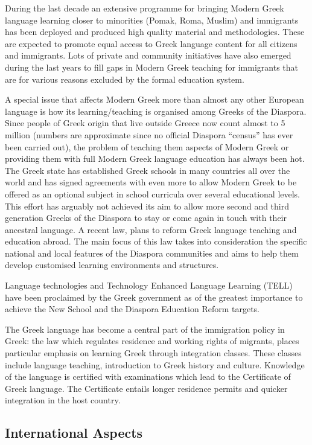 \begin{multicols}{2}
During the last decade an extensive programme for bringing Modern Greek language learning closer to minorities (Pomak, Roma, Muslim) and immigrants has been deployed and produced high quality material and methodologies. These are expected to promote equal access to Greek language content for all citizens and immigrants. Lots of private and community initiatives have also emerged during the last years to fill gaps in Modern Greek teaching for immigrants that are for various reasons excluded by the formal education system.

A special issue that affects Modern Greek more than almost any other European language is how its learning/teaching is organised among Greeks of the Diaspora. Since people of Greek origin that live outside Greece now count almost to 5 million (numbers are approximate since no official Diaspora “census” has ever been carried out), the problem of teaching them aspects of Modern Greek or providing them with full Modern Greek language education has always been hot. The Greek state has established Greek schools in many countries all over the world and has signed agreements with even more to allow Modern Greek to be offered as an optional subject in school curricula over several educational levels. This effort has arguably not achieved its aim to allow more second and third generation Greeks of the Diaspora to stay or come again in touch with their ancestral language. A recent law, plans to reform Greek language teaching and education abroad. The main focus of this law  takes into consideration the specific national and local features of the Diaspora communities and aims to help them develop customised learning environments and structures.

Language technologies and Technology Enhanced Language Learning (TELL) have been proclaimed by the Greek government as of the greatest importance to achieve the New School and the Diaspora Education Reform targets.

The Greek language has become a central part of the immigration policy in Greek: the law which regulates residence and working rights of migrants, places particular emphasis on learning Greek through integration classes. These classes include language teaching, introduction to Greek history and culture. Knowledge of the language is certified with examinations which lead to the Certificate of Greek language. The Certificate entails longer residence permits and quicker integration in the host country.

\subsection{International Aspects}


\end{multicols}
